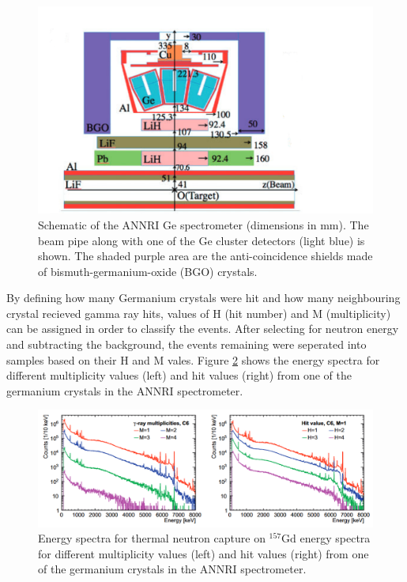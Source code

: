 \begin{figure}

        \includegraphics[width=\textwidth]{Figures/annrigd.png}
        \caption{Schematic of the ANNRI Ge spectrometer (dimensions in mm). The beam pipe along with one of the Ge cluster detectors (light blue) is shown. The shaded purple area are the anti-coincidence shields made of bismuth-germanium-oxide (BGO) crystals.}
        \label{fig:annrigd}
    
\end{figure}

By defining how many Germanium crystals were hit and how many neighbouring crystal recieved gamma ray hits, values of H (hit number) and M (multiplicity) can be assigned in order to classify the events. After selecting for neutron energy and subtracting the background, the events remaining were seperated into samples based on their H and M vales. Figure \ref{fig:annrigdenergyspectra} shows the energy spectra for different multiplicity values (left) and hit values (right) from one of the germanium crystals in the ANNRI spectrometer. 

\begin{figure}
\includegraphics[width=\textwidth]{Figures/annrigdenergyspectra.png}
\caption{Energy spectra for thermal neutron capture on ${ }^{157} \mathrm{Gd}$ energy spectra for different multiplicity values (left) and hit values (right) from one of the germanium crystals in the ANNRI spectrometer.}
\label{fig:annrigdenergyspectra}
\end{figure}

